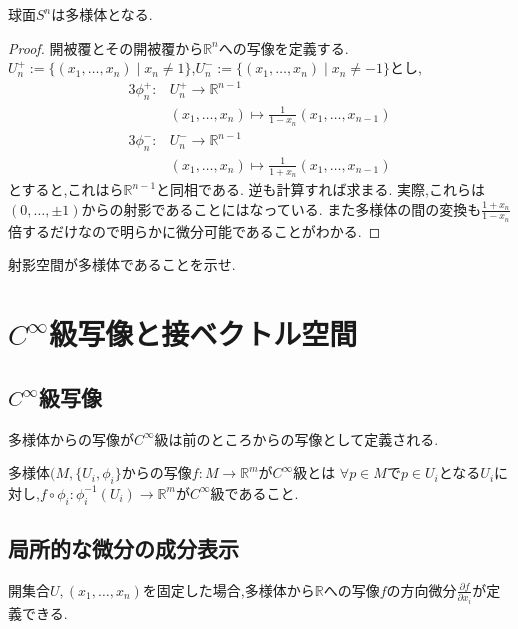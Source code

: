 \documentclass[dvipdfmx]{ujarticle}
\begin{document}
\begin{epl}
  球面$S^n$は多様体となる.
\end{epl}
\begin{proof}
開被覆とその開被覆から$\mathbb{R}^n$への写像を定義する.
$U_n^+ := \{(x_1,\dots,x_n) \mid x_n \neq 1 \}$,$U_n^- := \{(x_1,\dots,x_n) \mid x_n \neq -1 \}$とし,
\begin{alignat}{3}
\phi_n^+: & U_n^+ \to \mathbb{R}^{n-1} \\
          & (x_1,\dots,x_n)  \mapsto \frac{1}{1 - x_n}(x_1, \ldots , x_{n-1})
\end{alignat}
\begin{alignat}{3}
\phi_n^-: & U_n^- \to \mathbb{R}^{n-1} \\
          & (x_1,\dots,x_n)  \mapsto \frac{1}{1 + x_n}(x_1, \ldots , x_{n-1})
\end{alignat}
とすると,これはら$\mathbb{R}^{n-1}$と同相である. 逆も計算すれば求まる.
実際,これらは$(0, \ldots, \pm 1)$からの射影であることにはなっている.
また多様体の間の変換も$\frac{1 + x_n}{1 - x_n}$倍するだけなので明らかに微分可能であることがわかる.
\end{proof}

\begin{exs}
射影空間が多様体であることを示せ.
\end{exs}

\section{$C^{\infty}$級写像と接ベクトル空間}
\subsection{$C^{\infty}$級写像}
多様体からの写像が$C^{\infty}$級は前のところからの写像として定義される.
\begin{screen}
\begin{dfn}
多様体$(M, \{U_i, \phi_i\}$からの写像$f:M \to \mathbb{R}^m$が$C^{\infty}$級とは
$\forall p \in M$で$p \in U_i$となる$U_i$に対し,$f \circ \phi_i: \phi_i^{-1}(U_i) \to \mathbb{R}^m$が$C^{\infty}$級であること.
\end{dfn}
\end{screen}

\subsection{局所的な微分の成分表示}
開集合$U, (x_1,\dots,x_n)$を固定した場合,多様体から$\mathbb{R}$への写像$f$の方向微分$\frac{\partial f}{\partial x_i}$が定義できる.
\end{document}
